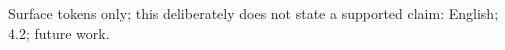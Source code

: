 Surface tokens only; this deliberately does not state a supported claim: English; 4.2; future work.

